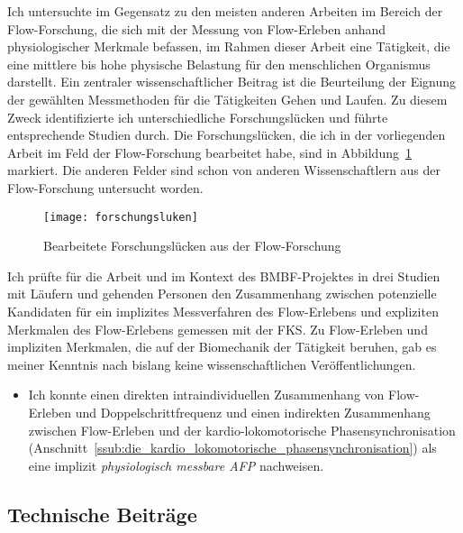 \label{ssub:empirische_beitrage}

Ich untersuchte im Gegensatz zu den meisten anderen Arbeiten im Bereich der Flow-Forschung, die sich mit der Messung von Flow-Erleben anhand physiologischer Merkmale befassen, im Rahmen dieser Arbeit eine Tätigkeit, die eine mittlere bis hohe physische Belastung für den menschlichen Organismus darstellt. Ein zentraler wissenschaftlicher Beitrag ist die Beurteilung der Eignung der gewählten Messmethoden für die Tätigkeiten Gehen und Laufen. Zu diesem Zweck identifizierte ich unterschiedliche Forschungslücken und führte entsprechende Studien durch. Die Forschungslücken, die ich in der vorliegenden Arbeit im Feld der Flow-Forschung bearbeitet habe, sind in Abbildung~\ref{fig:forschungsluken} markiert. Die anderen Felder sind schon von anderen Wissenschaftlern aus der Flow-Forschung untersucht worden. 
\begin{figure}
	[!htb] \centering 
	\texttt{[image: forschungsluken]} \caption[Bearbeitete Forschungslücken aus der Flow-Forschung]{Bearbeitete Forschungslücken aus der Flow-Forschung} \label{fig:forschungsluken} 
\end{figure}

Ich prüfte für die Arbeit und im Kontext des \acs{BMBF}-Projektes in drei Studien mit Läufern und gehenden Personen den Zusammenhang zwischen potenzielle Kandidaten für ein implizites Messverfahren des Flow-Erlebens und expliziten Merkmalen des Flow-Erlebens gemessen mit der \ac{FKS}. Zu Flow-Erleben und impliziten Merkmalen, die auf der Biomechanik der Tätigkeit beruhen, gab es meiner Kenntnis nach bislang keine wissenschaftlichen Veröffentlichungen. 
\begin{itemize}
	
	\item Ich konnte einen direkten intraindividuellen Zusammenhang von Flow-Erleben und Doppelschrittfrequenz und einen indirekten Zusammenhang zwischen Flow-Erleben und der kardio-lokomotorische Phasensynchronisation (Anschnitt~\ref{ssub:die_kardio_lokomotorische_phasensynchronisation}) als eine implizit \emph{physiologisch messbare \ac{AFP}} nachweisen.
\end{itemize}

\subsection{Technische Beiträge} 

\label{sub:technische_beitrage}

